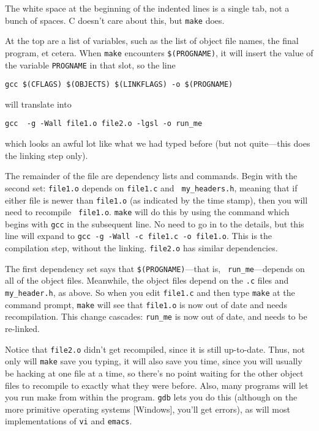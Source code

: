\documentclass[12pt]{article}
\begin{document}
The white space at the beginning of the indented lines is a single tab, not a bunch of spaces.
C doesn't care about this, but {\tt make} does.

At the top are a list of variables, such as the list of object file names, the final program, et cetera.
When {\tt make} encounters {\tt \$(PROGNAME)}, it will insert the value of the variable {\tt PROGNAME} in that
slot, so the line 
\begin{verbatim}
gcc $(CFLAGS) $(OBJECTS) $(LINKFLAGS) -o $(PROGNAME)
\end{verbatim}
will translate into
\begin{verbatim}
gcc  -g -Wall file1.o file2.o -lgsl -o run_me
\end{verbatim}
which looks an awful lot like what we had typed before (but not quite---this does the linking step only).

The remainder of the file are dependency lists and commands. Begin
with the second set: {\tt file1.o} depends on {\tt file1.c} and {\tt
my\_headers.h}, meaning that if either file is newer than {\tt file1.o}
(as indicated by the time stamp), then you will need to recompile {\tt
file1.o}. {\tt make} will do this by using the command which begins with
{\tt gcc} in the subsequent line. No need to go in to the details, but
this line will expand to {\tt gcc -g -Wall -c file1.c -o file1.o}. This
is the compilation step, without the linking. {\tt file2.o} has similar
dependencies.

The first dependency set says that {\tt \$(PROGNAME)}---that is, {\tt
run\_me}---depends on all of the object files. Meanwhile, the object files
depend on the {\tt .c} files and {\tt my\_header.h}, as above. So when
you edit {\tt file1.c} and then type {\tt make} at the command prompt,
{\tt make} will see that {\tt file1.o} is now out of date and needs
recompilation. This change cascades: {\tt run\_me} is now out of date,
and needs to be re-linked.

Notice that {\tt file2.o} didn't get recompiled, since it is still
up-to-date. Thus, not only will {\tt make} save you typing, it will also
save you time, since you will usually be hacking at one file at a time,
so there's no point waiting for the other object files to recompile
to exactly what they were before. Also, many programs will let you run
make from within the program. {\tt gdb} lets you do this (although on
the more primitive operating systems [Windows], you'll get errors),
as will most implementations of {\tt vi} and {\tt emacs}.
\end{document}
